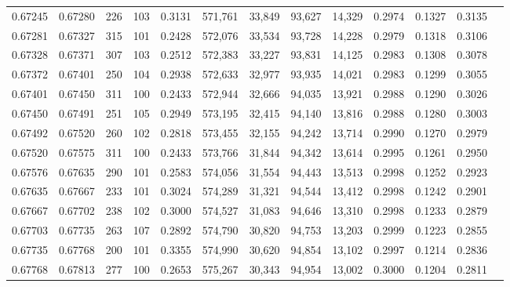 \begin{tabular}{rrrrrrrrrrrrr}
0.67245 & 0.67280 &   226 & 103 &                                     0.3131 & 571,761 &  33,849 &  93,627 &  14,329 & 0.2974 & 0.1327 & 0.3135 \\
0.67281 & 0.67327 &   315 & 101 &                                     0.2428 & 572,076 &  33,534 &  93,728 &  14,228 & 0.2979 & 0.1318 & 0.3106 \\
0.67328 & 0.67371 &   307 & 103 &                                     0.2512 & 572,383 &  33,227 &  93,831 &  14,125 & 0.2983 & 0.1308 & 0.3078 \\
0.67372 & 0.67401 &   250 & 104 &                                     0.2938 & 572,633 &  32,977 &  93,935 &  14,021 & 0.2983 & 0.1299 & 0.3055 \\
0.67401 & 0.67450 &   311 & 100 &                                     0.2433 & 572,944 &  32,666 &  94,035 &  13,921 & 0.2988 & 0.1290 & 0.3026 \\
0.67450 & 0.67491 &   251 & 105 &                                     0.2949 & 573,195 &  32,415 &  94,140 &  13,816 & 0.2988 & 0.1280 & 0.3003 \\
0.67492 & 0.67520 &   260 & 102 &                                     0.2818 & 573,455 &  32,155 &  94,242 &  13,714 & 0.2990 & 0.1270 & 0.2979 \\
0.67520 & 0.67575 &   311 & 100 &                                     0.2433 & 573,766 &  31,844 &  94,342 &  13,614 & 0.2995 & 0.1261 & 0.2950 \\
0.67576 & 0.67635 &   290 & 101 &                                     0.2583 & 574,056 &  31,554 &  94,443 &  13,513 & 0.2998 & 0.1252 & 0.2923 \\
0.67635 & 0.67667 &   233 & 101 &                                     0.3024 & 574,289 &  31,321 &  94,544 &  13,412 & 0.2998 & 0.1242 & 0.2901 \\
0.67667 & 0.67702 &   238 & 102 &                                     0.3000 & 574,527 &  31,083 &  94,646 &  13,310 & 0.2998 & 0.1233 & 0.2879 \\
0.67703 & 0.67735 &   263 & 107 &                                     0.2892 & 574,790 &  30,820 &  94,753 &  13,203 & 0.2999 & 0.1223 & 0.2855 \\
0.67735 & 0.67768 &   200 & 101 &                                     0.3355 & 574,990 &  30,620 &  94,854 &  13,102 & 0.2997 & 0.1214 & 0.2836 \\
0.67768 & 0.67813 &   277 & 100 &                                     0.2653 & 575,267 &  30,343 &  94,954 &  13,002 & 0.3000 & 0.1204 & 0.2811 \\

\end{tabular}
